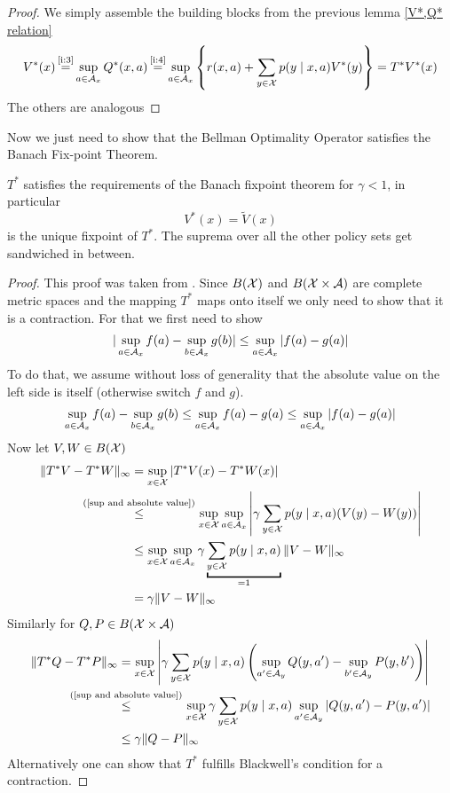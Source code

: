 \begin{proof}
	We simply assemble the building blocks from the previous lemma \ref{V*,Q* relation}
\begin{align*}
	V^*(x)\xeq{\text{\ref{i:3}}}\sup_{a\in\cA_x}Q^*(x,a)
	\xeq{\text{\ref{i:4}}}\sup_{a\in\cA_x}\left\{r(x,a)+\sum_{y\in\cX}p(y\mid x,a) V^*(y)\right\} =T^*V^*(x)
\end{align*}
The others are analogous
\end{proof}

Now we just need to show that the Bellman Optimality Operator satisfies the Banach Fix-point Theorem.

\begin{thm}\label{T^* satisfies BFT}
\(T^*\) satisfies the requirements of the Banach fixpoint theorem for \(\gamma<1\), in particular
	\[V^*(x)=\tilde{V}(x) \]
is the unique fixpoint of \(T^*\). The suprema over all the other policy sets get sandwiched in between.
\end{thm}
\begin{proof}
	This proof was taken from \textcite[79]{szepesvariAlgorithmsReinforcementLearning2010}. 
	Since \(B(\mathcal{X})\) and \(B(\mathcal{X}\times\mathcal{A})\) are complete metric spaces and the mapping \(T^*\) maps onto itself we only need to show that it is a contraction. For that we first need to show
	\begin{align}\label{sup and absolute value}
		|\sup_{a\in\mathcal{A}_x} f(a) -\sup_{b\in\mathcal{A}_x}g(b)| \le \sup_{a\in\mathcal{A}_x}|f(a)-g(a)|
	\end{align}
	To do that, we assume without loss of generality that the absolute value on the left side is itself (otherwise switch \(f\) and \(g\)).
	\begin{align*}
		\sup_{a\in\mathcal{A}_x} f(a) -\sup_{b\in\mathcal{A}_x}g(b) \le \sup_{a\in\mathcal{A}_x} f(a)- g(a)\le \sup_{a\in\mathcal{A}_x}|f(a)-g(a)|
	\end{align*}
	Now let \(V, W \in B(\mathcal{X}) \)
	\begin{align*}
		\|T^*V -T^*W\|_\infty
		&=\sup_{x\in\cX} |T^*V(x) -T^*W(x)|\\
		&\lxlq{\text{(\ref{sup and absolute value})}}\sup_{x\in\cX}\sup_{a\in\cA_x}
		\left|\gamma\sum_{y\in\cX}p(y\mid x,a) (V(y) -W(y))\right|\\
		&\le \sup_{x\in\cX}\sup_{a\in\cA_x} 
		\gamma\underbracket{\sum_{y\in\cX}p(y\mid x,a)}_{=1} \|V-W\|_\infty\\
		&=\gamma \|V-W\|_\infty
	\end{align*}
	Similarly for \(Q, P\in B(\mathcal{X}\times\mathcal{A})\)
	\begin{align*}
		\|T^*Q -T^*P\|_\infty
		&=\sup_{x\in\cX} \left|\gamma \sum_{y\in\cX} p(y\mid x,a) 
		\left(\sup_{a'\in\cA_y}Q(y, a') -\sup_{b'\in\cA_y}P(y,b') \right) \right|\\
		&\lxlq{\text{(\ref{sup and absolute value})}}\sup_{x\in\cX} 
		\gamma \sum_{y\in\cX} p(y\mid x,a) \sup_{a'\in\cA_y} |Q(y, a')-P(y,a')|\\
		&\le \gamma \|Q-P\|_\infty \qedhere
	\end{align*}
	Alternatively one can show that \(T^*\) fulfills Blackwell's condition for a contraction. 
\end{proof}

